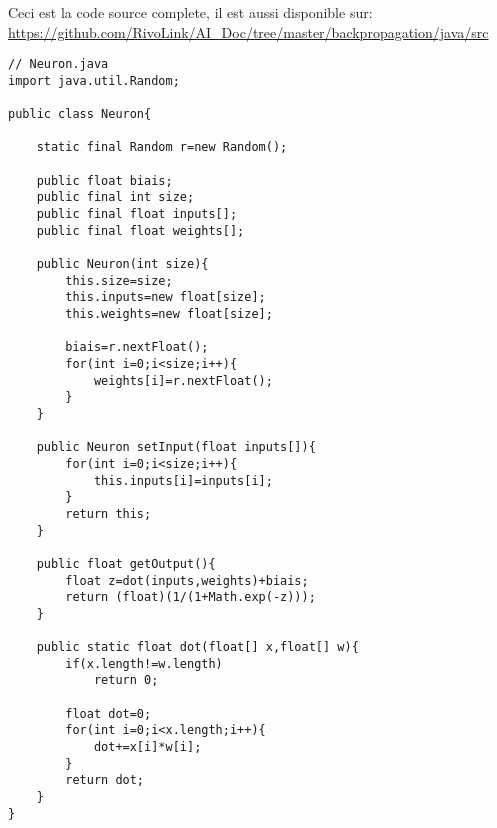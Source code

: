 \documentclass{article}
\begin{document}
\newpage

Ceci est la code source complete, il est aussi disponible sur: \url{https://github.com/RivoLink/AI_Doc/tree/master/backpropagation/java/src}

\begin{lstlisting}
// Neuron.java
import java.util.Random;

public class Neuron{

	static final Random r=new Random();
	
	public float biais;
	public final int size;
	public final float inputs[];
	public final float weights[];
	
	public Neuron(int size){
		this.size=size;
		this.inputs=new float[size];
		this.weights=new float[size];
		
		biais=r.nextFloat();
		for(int i=0;i<size;i++){
			weights[i]=r.nextFloat();
		}
	}
	
	public Neuron setInput(float inputs[]){
		for(int i=0;i<size;i++){
			this.inputs[i]=inputs[i];
		}
		return this;
	}
	
	public float getOutput(){
		float z=dot(inputs,weights)+biais;
		return (float)(1/(1+Math.exp(-z)));
	}

	public static float dot(float[] x,float[] w){
		if(x.length!=w.length)
			return 0;

		float dot=0;
		for(int i=0;i<x.length;i++){
			dot+=x[i]*w[i];
		}
		return dot;
	}
}

\end{lstlisting}

\newpage
\end{document}
